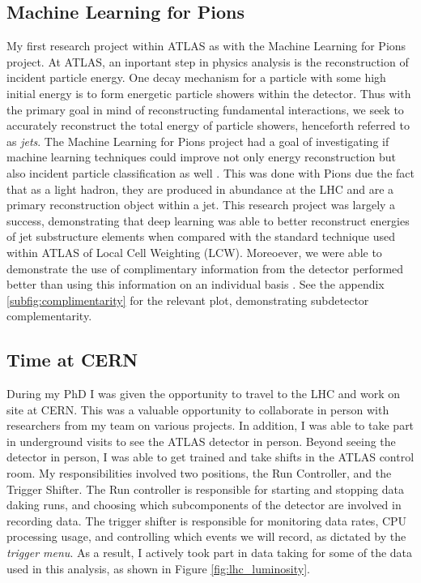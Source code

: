 \documentclass[12pt]{article}
\begin{document}
\subsection{Machine Learning for Pions}
My first research project within ATLAS as with the Machine Learning for Pions
project. At ATLAS, an inportant step in physics analysis is the reconstruction
of incident particle energy. One decay mechanism for a particle with some high
initial energy is to form energetic particle showers within the detector. Thus
with the primary goal in mind of reconstructing fundamental interactions, we
seek to accurately reconstruct the total energy of particle showers, henceforth
referred to as \textit{jets}. The Machine Learning for Pions project had a goal
of investigating if machine learning techniques could improve not only energy
reconstruction but also incident particle classification as well
\cite{ml4p_prelim}. This was done with Pions due the fact that as a light
hadron, they are produced in abundance at the LHC and are a primary
reconstruction object within a jet. This research project was largely a success,
demonstrating that deep learning was able to better reconstruct energies of jet
substructure elements when compared with the standard technique used within
ATLAS of Local Cell Weighting (LCW). Moreoever, we were able to demonstrate the
use of complimentary information from the detector performed better than using
this information on an individual basis \cite{ml4p}. See the appendix
\ref{subfig:complimentarity} for the relevant plot, demonstrating subdetector
complementarity.

\subsection{Time at CERN}
During my PhD I was given the opportunity to travel to the LHC and work on site
at CERN. This was a valuable opportunity to collaborate in person with
researchers from my team on various projects. In addition, I was able to take
part in underground visits to see the ATLAS detector in person. Beyond seeing
the detector in person, I was able to get trained and take shifts in the ATLAS
control room. My responsibilities involved two positions, the Run Controller,
and the Trigger Shifter. The Run controller is responsible for starting and
stopping data daking runs, and choosing which subcomponents of the detector are
involved in recording data. The trigger shifter is responsible for monitoring
data rates, CPU processing usage, and controlling which events we will record,
as dictated by the \textit{trigger menu}. As a result, I actively took part in
data taking for some of the data used in this analysis, as shown in Figure
\ref{fig:lhc_luminosity}.
\end{document}
